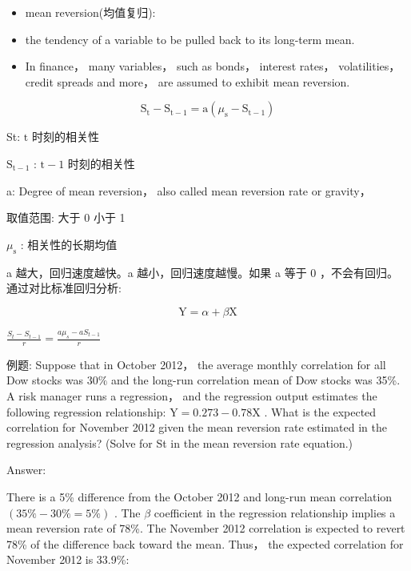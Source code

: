 \begin{itemize}
\item mean reversion(均值复归):
\end{itemize}

\begin{itemize}
\item the tendency of a variable to be pulled back to its long-term mean.
\end{itemize}

\begin{itemize}
\item In finance， many variables， such as bonds， interest rates， volatilities， credit spreads and more， are assumed to exhibit mean reversion.
\end{itemize}

\[
{\mathrm{S}}_{\mathrm{t}} - {\mathrm{S}}_{\mathrm{t} - 1} = \mathrm{a}\left( {{\mu }_{\mathrm{s}} - {\mathrm{S}}_{\mathrm{t} - 1}}\right)
\]

St: \(\mathrm{t}\) 时刻的相关性

\({\mathrm{S}}_{\mathrm{t} - 1}\) : \(\mathrm{t} - 1\) 时刻的相关性

a: Degree of mean reversion， also called mean reversion rate or gravity，

取值范围: 大于 0 小于 1

\({\mu }_{\mathrm{s}}\) : 相关性的长期均值

 a 越大，回归速度越快。a 越小，回归速度越慢。如果 a 等于 0 ，不会有回归。 通过对比标准回归分析:

\[
\mathrm{Y} = \alpha  + \beta \mathrm{X}
\]

\(\frac{{S}_{t} - {S}_{t - 1}}{r} = \frac{a{\mu }_{s} - a{S}_{t - 1}}{r}\)

例题: Suppose that in October 2012， the average monthly correlation for all Dow stocks was \({30}\%\) and the long-run correlation mean of Dow stocks was 35\%. A risk manager runs a regression， and the regression output estimates the following regression relationship: \(\mathrm{Y} = {0.273} - {0.78}\mathrm{X}\) . What is the expected correlation for November 2012 given the mean reversion rate estimated in the regression analysis? (Solve for St in the mean reversion rate equation.)

Answer:

There is a 5\% difference from the October 2012 and long-run mean correlation \(\left( {{35}\%  - {30}\%  = 5\% }\right)\) . The \(\beta\) coefficient in the regression relationship implies a mean reversion rate of 78\%. The November 2012 correlation is expected to revert 78\% of the difference back toward the mean. Thus， the expected correlation for November 2012 is 33.9\%:


